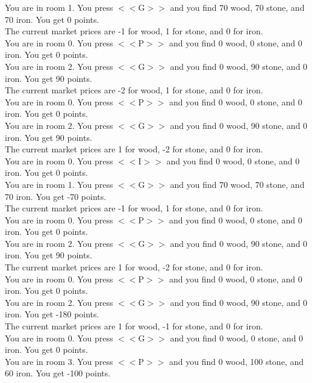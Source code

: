 \documentclass[pdflatex,sn-nature]{sn-jnl}%
\theoremstyle{thmstyleone}%
\theoremstyle{thmstyletwo}%
\theoremstyle{thmstylethree}%
\begin{document}
You are in room 1. You press $<<$G$>>$ and you find 70 wood, 70 stone, and 70 iron. You get 0 points. $~$\\ 
The current market prices are -1 for wood, 1 for stone, and 0 for iron. $~$\\ 
You are in room 0. You press $<<$P$>>$ and you find 0 wood, 0 stone, and 0 iron. You get 0 points. $~$\\ 
You are in room 2. You press $<<$G$>>$ and you find 0 wood, 90 stone, and 0 iron. You get 90 points. $~$\\ 
The current market prices are -2 for wood, 1 for stone, and 0 for iron. $~$\\ 
You are in room 0. You press $<<$P$>>$ and you find 0 wood, 0 stone, and 0 iron. You get 0 points. $~$\\ 
You are in room 2. You press $<<$G$>>$ and you find 0 wood, 90 stone, and 0 iron. You get 90 points. $~$\\ 
The current market prices are 1 for wood, -2 for stone, and 0 for iron. $~$\\ 
You are in room 0. You press $<<$I$>>$ and you find 0 wood, 0 stone, and 0 iron. You get 0 points. $~$\\ 
You are in room 1. You press $<<$G$>>$ and you find 70 wood, 70 stone, and 70 iron. You get -70 points. $~$\\ 
The current market prices are -1 for wood, 1 for stone, and 0 for iron. $~$\\ 
You are in room 0. You press $<<$P$>>$ and you find 0 wood, 0 stone, and 0 iron. You get 0 points. $~$\\ 
You are in room 2. You press $<<$G$>>$ and you find 0 wood, 90 stone, and 0 iron. You get 90 points. $~$\\ 
The current market prices are 1 for wood, -2 for stone, and 0 for iron. $~$\\ 
You are in room 0. You press $<<$P$>>$ and you find 0 wood, 0 stone, and 0 iron. You get 0 points. $~$\\ 
You are in room 2. You press $<<$G$>>$ and you find 0 wood, 90 stone, and 0 iron. You get -180 points. $~$\\ 
The current market prices are 1 for wood, -1 for stone, and 0 for iron. $~$\\ 
You are in room 0. You press $<<$G$>>$ and you find 0 wood, 0 stone, and 0 iron. You get 0 points. $~$\\ 
You are in room 3. You press $<<$P$>>$ and you find 0 wood, 100 stone, and 60 iron. You get -100 points. $~$\\ 
\end{document}
